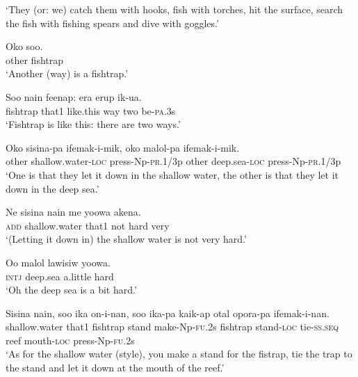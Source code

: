\glt ‘They (or: we) catch them with hooks, fish with torches, hit the surface, search the fish with fishing spears and dive with goggles.’ \\
\z


\ea\label{ex:a:x3}
\gll  Oko  soo. \\
other  fishtrap \\
\glt ‘Another (way) is a fishtrap.’ \\
\z


\ea\label{ex:a:x4}
\gll  Soo  nain  feenap:  era  erup  ik-ua. \\
fishtrap  that1  like.this  way  two  be-\textsc{pa}.3s \\
\glt ‘Fishtrap is like this: there are two ways.’ \\
\z


\ea\label{ex:a:x5}
\gll  Oko  sisina-pa  ifemak-i-mik,  oko  malol-pa               ifemak-i-mik. \\
other  shallow.water-\textsc{loc}  press-Np-\textsc{pr}.1/3p  other  deep.sea-\textsc{loc}  press-Np-\textsc{pr}.1/3p \\


\glt ‘One is that they let it down in the shallow water, the other is that they let it down in the deep sea.’ \\
\z


\ea\label{ex:a:x6}
\gll  Ne  sisina  nain  me  yoowa  akena. \\
\textsc{add}  shallow.water  that1  not  hard  very \\
\glt ‘(Letting it down in) the shallow water is not very hard.’ \\
\z


\ea\label{ex:a:x7}
\gll  Oo  malol  lawisiw  yoowa. \\
\textsc{intj}  deep.sea  a.little  hard \\
\glt ‘Oh the deep sea is a bit hard.’ \\
\z


\ea\label{ex:a:x8}
\gll  Sisina  nain,  soo  ika  on-i-nan,              soo  ika-pa  kaik-ap  otal  opora-pa              ifemak-i-nan. \\
shallow.water  that1  fishtrap  stand  make-Np-\textsc{fu}.2s  fishtrap  stand-\textsc{loc}  tie-\textsc{ss.seq}  reef  mouth-\textsc{loc}  press-Np-\textsc{fu}.2s \\




\glt ‘As for the shallow water (style), you make a stand for the fistrap, tie the trap to the stand and let it down at the mouth of the reef.’ \\
\z


